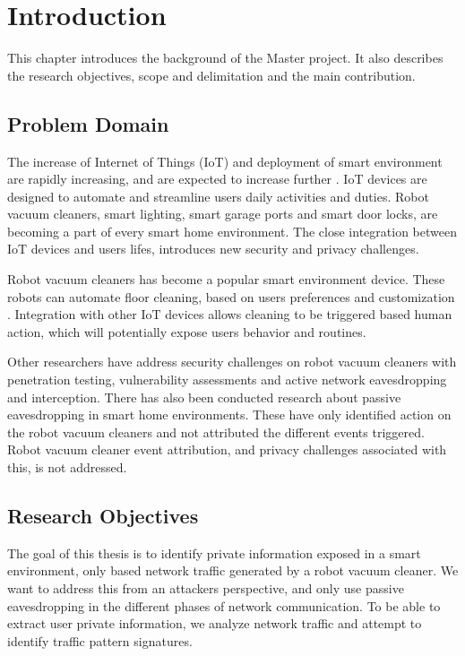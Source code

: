 \chapter{Introduction}
This chapter introduces the background of the Master project. It also describes the research objectives, scope and delimitation and the main contribution.  
 
\section{Problem Domain}

The increase of Internet of Things (IoT) and deployment of smart environment are rapidly increasing, and are expected to increase further \cite{iotgrowth}. IoT 
devices are designed to automate and streamline users daily activities and duties. Robot vacuum cleaners, smart lighting, smart garage ports and smart door locks, are becoming a part of every smart home environment. The close integration between IoT devices and users lifes, introduces new security and privacy challenges.

Robot vacuum cleaners has become a popular smart environment device. These robots can automate floor cleaning, based on users preferences and customization \cite{roboticvacuumcleaner2021}. Integration with other IoT devices allows cleaning to be triggered based human action, which will potentially expose users behavior and routines. 

Other researchers have address security challenges on robot vacuum cleaners with penetration testing, vulnerability assessments and active network eavesdropping and interception. There has also been conducted research about passive eavesdropping in smart home environments. These have only identified action on the robot vacuum cleaners and not attributed the different events triggered. Robot vacuum cleaner event attribution, and privacy challenges associated with this, is not addressed.

\section{Research Objectives}

The goal of this thesis is to identify private information exposed in a smart environment, only based network traffic generated by a robot vacuum cleaner. We want to address this from an attackers perspective, and only use passive eavesdropping in the different phases of network communication. To be able to extract user private information, we analyze network traffic and attempt to identify traffic pattern signatures.

